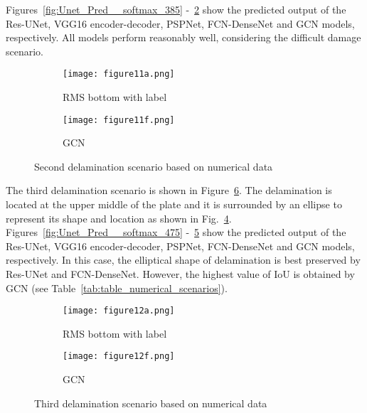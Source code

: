 \documentclass[runningheads]{llncs}
\begin{document}
Figures~\ref{fig:Unet_Pred__softmax_385} -~\ref{fig:gcn_pred_385} show the predicted output of the Res-UNet, VGG16 encoder-decoder, PSPNet, FCN-DenseNet and GCN models, respectively. 
All models perform reasonably well, considering the difficult damage scenario.
\begin{figure}[!ht]
	\centering
	\begin{subfigure}[b]{0.47\textwidth}
		\centering
		\texttt{[image: figure11a.png]}
		\caption{RMS bottom with label}
		\label{fig:RMS_flat_shell_Vz_385}
	\end{subfigure}

	\begin{subfigure}[b]{0.47\textwidth}
		\centering
		\texttt{[image: figure11f.png]}
		\caption{GCN}
		\label{fig:gcn_pred_385}
	\end{subfigure}
	\caption{Second delamination scenario based on numerical data}
	\label{fig:385_softmax}
\end{figure}
The third delamination scenario is shown in Figure~\ref{fig:475_softmax}. 
The delamination is located at the upper middle of the plate and it is surrounded by an ellipse to represent its shape and location as shown in Fig.~\ref{fig:RMS_flat_shell_Vz_475}.
Figures~\ref{fig:Unet_Pred__softmax_475} -~\ref{fig:gcn_pred_475} show the predicted output of the Res-UNet, VGG16 encoder-decoder, PSPNet, FCN-DenseNet and GCN models, respectively. 
In this case, the elliptical shape of delamination is best preserved by Res-UNet and FCN-DenseNet. 
However, the highest value of IoU is obtained by GCN (see Table~\ref{tab:table_numerical_scenarios}).
\begin{figure}[!ht]
	\centering
	\begin{subfigure}[b]{0.47\textwidth}
		\centering
		\texttt{[image: figure12a.png]}
		\caption{RMS bottom with label}
		\label{fig:RMS_flat_shell_Vz_475}
	\end{subfigure}
	\begin{subfigure}[b]{0.47\textwidth}
		\centering
		\texttt{[image: figure12f.png]}
		\caption{GCN}
		\label{fig:gcn_pred_475}
	\end{subfigure}	
	\caption{Third delamination scenario based on numerical data}
	\label{fig:475_softmax}
\end{figure}
\end{document}
